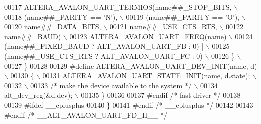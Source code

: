 \begin{DoxyCode}
00117 \textcolor{preprocessor}{       ALTERA\_AVALON\_UART\_TERMIOS(name##\_STOP\_BITS,    \(\backslash\)}
00118 \textcolor{preprocessor}{                               (name##\_PARITY == 'N'), \(\backslash\)}
00119 \textcolor{preprocessor}{                               (name##\_PARITY == 'O'), \(\backslash\)}
00120 \textcolor{preprocessor}{                               name##\_DATA\_BITS,       \(\backslash\)}
00121 \textcolor{preprocessor}{                               name##\_USE\_CTS\_RTS,     \(\backslash\)}
00122 \textcolor{preprocessor}{                               name##\_BAUD)            \(\backslash\)}
00123 \textcolor{preprocessor}{       ALTERA\_AVALON\_UART\_FREQ(name)                   \(\backslash\)}
00124 \textcolor{preprocessor}{       (name##\_FIXED\_BAUD ? ALT\_AVALON\_UART\_FB : 0) |  \(\backslash\)}
00125 \textcolor{preprocessor}{         (name##\_USE\_CTS\_RTS ? ALT\_AVALON\_UART\_FC : 0) \(\backslash\)}
00126 \textcolor{preprocessor}{     \}                                                 \(\backslash\)}
00127 \textcolor{preprocessor}{   \}}
00128 
00129 \textcolor{preprocessor}{#define ALTERA\_AVALON\_UART\_DEV\_INIT(name, d)           \(\backslash\)}
00130 \textcolor{preprocessor}{  \{                                                    \(\backslash\)}
00131 \textcolor{preprocessor}{    ALTERA\_AVALON\_UART\_STATE\_INIT(name, d.state);      \(\backslash\)}
00132 \textcolor{preprocessor}{                                                       \(\backslash\)}
00133 \textcolor{preprocessor}{    }\textcolor{comment}{/* make the device available to the system */}\textcolor{preprocessor}{      \(\backslash\)}
00134 \textcolor{preprocessor}{    alt\_dev\_reg(&d.dev);                               \(\backslash\)}
00135 \textcolor{preprocessor}{  \}}
00136 
00137 \textcolor{preprocessor}{#endif }\textcolor{comment}{/* fast driver */}\textcolor{preprocessor}{}
00138 
00139 \textcolor{preprocessor}{#ifdef \_\_cplusplus}
00140 \}
00141 \textcolor{preprocessor}{#endif }\textcolor{comment}{/* \_\_cplusplus */}\textcolor{preprocessor}{}
00142 
00143 \textcolor{preprocessor}{#endif }\textcolor{comment}{/* \_\_ALT\_AVALON\_UART\_FD\_H\_\_ */}\textcolor{preprocessor}{}
\end{DoxyCode}
